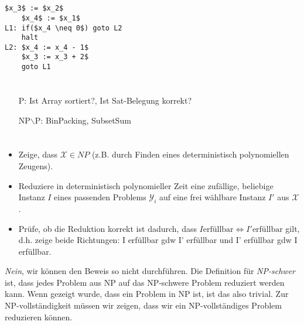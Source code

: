 \documentclass{article}
\begin{document}
\section{}%
\begin{lstlisting}[mathescape]
    $x_3$ := $x_2$
    $x_4$ := $x_1$
L1: if($x_4 \neq 0$) goto L2
    halt
L2: $x_4 := x_4 - 1$
    $x_3 := x_3 + 2$
    goto L1
\end{lstlisting}

\section{}%
\begin{center}
\end{center}
\begin{enumerate}
	\item[P:] Ist Array sortiert?, Ist Sat-Belegung korrekt?
  \item[NP$\backslash$P:] BinPacking, SubsetSum
\end{enumerate}

\section{}%
\begin{itemize}
	\item Zeige, dass $\mathcal{X}\in NP$ (z.B. durch Finden eines deterministisch polynomiellen Zeugens).
  \item Reduziere in deterministisch polynomieller Zeit eine zufällige, beliebige Instanz $I$ eines passenden Problems $\mathcal{Y}_i$ auf eine frei wählbare Instanz $I'$ aus $\mathcal{X}$.
  \item Prüfe, ob die Reduktion korrekt ist dadurch, dass $I \text{erfüllbar} \Leftrightarrow I' \text{erfüllbar}$ gilt, d.h. zeige beide Richtungen: I erfüllbar gdw I' erfüllbar und I' erfüllbar gdw I erfüllbar.
\end{itemize}
\emph{Nein}, wir können den Beweis so nicht durchführen. Die Definition für \emph{NP-schwer} ist, dass jedes Problem aus NP auf das NP-schwere Problem reduziert werden kann. Wenn gezeigt wurde, dass ein Problem in NP ist, ist das also trivial. Zur NP-vollständigkeit müssen wir zeigen, dass wir ein NP-vollständiges Problem reduzieren können.
\end{document}
